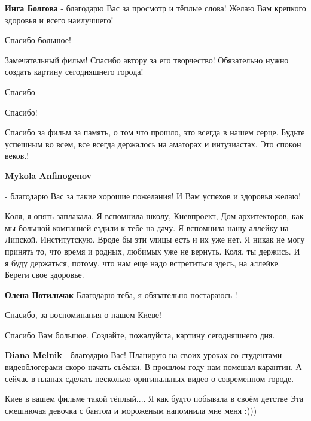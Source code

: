\begin{itemize}
\begin{itemize} %
\textbf{Инга Болгова} - благодарю Вас за просмотр и тёплые слова! Желаю Вам крепкого здоровья и всего наилучшего!
\end{itemize} %

Спасибо большое!

Замечательный фильм! Спасибо автору за его творчество! Обязательно нужно создать картину сегодняшнего города!

Спасибо

Спасибо!


Спасибо за фильм за память, о том что прошло, это всегда в нашем серце. Будьте
успешным во всем, все всегда держалось на аматорах и интузиастах. Это спокон
веков.!

\begin{itemize} %
\textbf{Mykola Anfinogenov} 

- благодарю Вас за такие хорошие пожелания! И Вам успехов и здоровья желаю!


Коля, я опять заплакала. Я вспомнила школу, Киевпроект, Дом архитекторов, как
мы большой компанией ездили к тебе на дачу. Я вспомнила нашу аллейку на
Липской. Институтскую. Вроде бы эти улицы есть и их уже нет. Я никак не могу
принять то, что время и родных, любимых уже не вернуть. Коля, ты держись. И я
буду держаться, потому, что нам еще надо встретиться здесь, на аллейке. Береги
свое здоровье.

\textbf{Олена Потильчак} Благодарю теба, я обязательно постараюсь !
\end{itemize} %

Спасибо, за воспоминания о нашем Киеве!

Спасибо Вам большое. Создайте, пожалуйста, картину сегодняшнего дня.

\begin{itemize} %
\textbf{Diana Melnik} - благодарю Вас! Планирую на своих уроках со студентами-видеоблогерами скоро начать съёмки. В прошлом году нам помешал карантин. А сейчас в планах сделать несколько оригинальных видео о современном городе.
\end{itemize} %

Киев в вашем фильме такой тёплый....
Я как будто побывала в своём детстве
Эта смешнючая девочка с бантом и мороженым напомнила мне меня :)))


\end{itemize}
